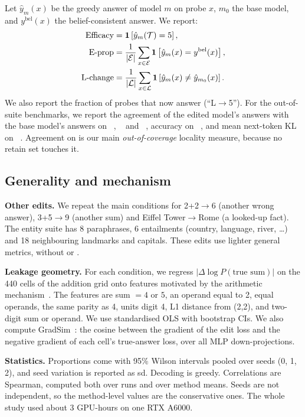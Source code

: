 Let $\hat{y}_m(x)$ be the greedy answer of model $m$ on probe $x$, $m_0$ the base model, and $y^{\text{bel}}(x)$ the belief-consistent answer. We report:
\begin{align}
    \text{Efficacy} &= \mathbf{1}\left[\hat{y}_m(\mathcal{T})=5\right], \\
    \text{E-prop} &= \frac{1}{|\mathcal{E}|}\sum_{x\in\mathcal{E}}\mathbf{1}\left[\hat{y}_m(x)=y^{\text{bel}}(x)\right], \\
    \text{L-change} &= \frac{1}{|\mathcal{L}|}\sum_{x\in\mathcal{L}}\mathbf{1}\left[\hat{y}_m(x)\ne\hat{y}_{m_0}(x)\right].
\end{align}
We also report the fraction of \setL probes that now answer  (``L$\to$5''). For the out-of-suite benchmarks, we report the agreement of the edited model's answers with the base model's answers on \eleuther~\citep{brown2020gpt3}, \counterfact~\citep{meng2022rome} and \mmlu~\citep{hendrycks2021mmlu}, accuracy on \gsm~\citep{cobbe2021gsm8k}, and mean next-token KL on \wikitext~\citep{merity2017wikitext}. Agreement on \eleuther is our main \emph{out-of-coverage} locality measure, because no retain set touches it.

\subsection{Generality and mechanism}

{\bf Other edits.} We repeat the main conditions for 2+2$\to$6 (another wrong answer), 3+5$\to$9 (another sum) and Eiffel Tower$\to$Rome (a looked-up fact). The entity suite has 8 paraphrases, 6 entailments (country, language, river, \dots) and 18 neighbouring landmarks and capitals. These edits use lighter general metrics, without \mmlu or \gsm.

{\bf Leakage geometry.} For each condition, we regress $|\Delta\log P(\text{true sum})|$ on the 440 cells of the addition grid onto features motivated by the arithmetic mechanism~\citep{nikankin2025heuristics,kantamneni2025helix}. The features are sum $=4$ or $5$, an operand equal to 2, equal operands, the same parity as 4, units digit 4, L1 distance from (2,2), and two-digit sum or operand. We use standardised OLS with bootstrap CIs. We also compute GradSim~\citep{qin2024messy}: the cosine between the gradient of the edit loss and the negative gradient of each cell's true-answer loss, over all MLP down-projections.

{\bf Statistics.} Proportions come with 95\% Wilson intervals pooled over seeds (0, 1, 2), and seed variation is reported as sd. Decoding is greedy. Correlations are Spearman, computed both over runs and over method means. Seeds are not independent, so the method-level values are the conservative ones. The whole study used about 3 GPU-hours on one RTX A6000.
